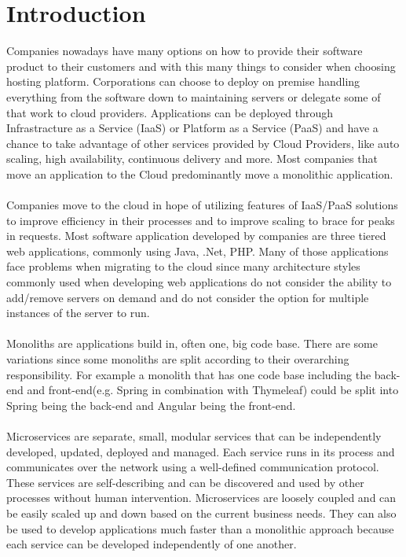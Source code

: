 \documentclass[BIF,Master,nenglish]{twbook}%
\begin{document}
\maketitle

%
%
\chapter{Introduction}
Companies nowadays have many options on how to provide their software product to their customers and with this many things to consider when choosing hosting platform. Corporations can choose to deploy on premise handling everything from the software down to maintaining servers or delegate some of that work to cloud providers. Applications can be deployed through Infrastracture as a Service (IaaS)\cite{microIaas} or Platform as a Service (PaaS)\cite{redPaas} and have a chance to take advantage of other services provided by Cloud Providers, like auto scaling, high availability, continuous delivery and more. Most companies that move an application to the Cloud predominantly move a monolithic application. 
\\
\\
Companies move to the cloud in hope of utilizing features of IaaS/PaaS solutions to improve efficiency in their processes and to improve scaling to brace for peaks in requests. Most software application developed by companies are three tiered web applications, commonly using Java, .Net, PHP. Many of those applications face problems when migrating to the cloud since many architecture styles commonly used when developing web applications do not consider the ability to add/remove servers on demand and do not consider the option for multiple instances of the server to run.
\\
\\
Monoliths are applications build in, often one, big code base. There are some variations since some monoliths are split according to their overarching responsibility. For example a monolith that has one code base including the back-end and front-end(e.g. Spring in combination with Thymeleaf) could be split into Spring being the back-end and Angular being the front-end.
\\
\\
Microservices are separate, small, modular services that can be independently developed, updated, deployed and managed. Each service runs in its process and communicates over the network using a well-defined communication protocol. These services are self-describing and can be discovered and used by other processes without human intervention. Microservices are loosely coupled and can be easily scaled up and down based on the current business needs. They can also be used to develop applications much faster than a monolithic approach because each service can be developed independently of one another.\cite{ade2017}
\end{document}
